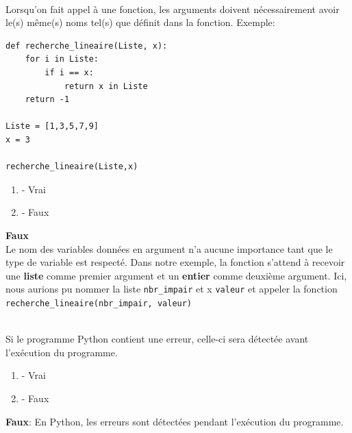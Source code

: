\begin{Exercice}[2 minutes]\\
Lorsqu'on fait appel à une fonction, les arguments doivent nécessairement avoir le(s) même(s) noms tel(s) que définit dans la fonction. Exemple:\\
\begin{lstlisting}
def recherche_lineaire(Liste, x):
    for i in Liste:
        if i == x:
            return x in Liste
    return -1

Liste = [1,3,5,7,9]
x = 3

recherche_lineaire(Liste,x)

\end{lstlisting}
\begin{enumerate}[label=\Alph*]
    \item - Vrai
    \item - Faux
\end{enumerate}
\begin{solution}
    \textbf{Faux}\\
    Le nom des variables données en argument n'a aucune importance tant que le type de variable est respecté. Dans notre exemple, la fonction s'attend à recevoir  une \textbf{liste} comme premier argument et un \textbf{entier} comme deuxième argument. Ici, nous aurions pu nommer la liste \lstinline{nbr_impair} et x \lstinline{valeur} et appeler la fonction \lstinline{recherche_lineaire(nbr_impair, valeur)}

\end{solution}
\end{Exercice}

\begin{Exercice}[2 minutes]\\
Si le programme Python contient une erreur, celle-ci sera détectée avant l'exécution du programme. 

\begin{enumerate}[label=\Alph*]
    \item - Vrai
    \item - Faux
\end{enumerate}
\begin{solution}
    \textbf{Faux}: En Python, les erreurs sont détectées pendant l'exécution du programme.
\end{solution}
\end{Exercice}


